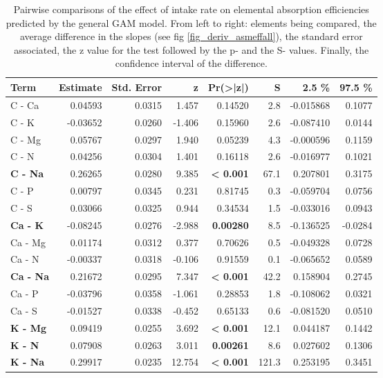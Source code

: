 \begin{table}[H]
\centering
\caption{\label{tab:table_pairs_d_ae}Pairwise comparisons of the effect of intake rate on elemental absorption efficiencies predicted by the general GAM model. From left to right: elements being compared, the average difference in the slopes (see fig \ref{fig_deriv_asmeffall}), the standard error associated, the z value for the test followed by the p- and the S- values. Finally, the confidence interval of the difference.}
\centering
\begin{tabular}[t]{>{}lrrr>{}rrrr}
\toprule
\textbf{Term} & \textbf{Estimate} & \textbf{Std. Error} & \textbf{z} & \textbf{Pr(>|z|)} & \textbf{S} & \textbf{2.5 \%} & \textbf{97.5 \%}\\
\midrule
C - Ca & 0.04593 & 0.0315 & 1.457 & 0.14520 & 2.8 & -0.015868 & 0.1077\\
C - K & -0.03652 & 0.0260 & -1.406 & 0.15960 & 2.6 & -0.087410 & 0.0144\\
C - Mg & 0.05767 & 0.0297 & 1.940 & 0.05239 & 4.3 & -0.000596 & 0.1159\\
C - N & 0.04256 & 0.0304 & 1.401 & 0.16118 & 2.6 & -0.016977 & 0.1021\\
\textbf{C - Na} & 0.26265 & 0.0280 & 9.385 & \textbf{< 0.001} & 67.1 & 0.207801 & 0.3175\\
C - P & 0.00797 & 0.0345 & 0.231 & 0.81745 & 0.3 & -0.059704 & 0.0756\\
C - S & 0.03066 & 0.0325 & 0.944 & 0.34534 & 1.5 & -0.033016 & 0.0943\\
\textbf{Ca - K} & -0.08245 & 0.0276 & -2.988 & \textbf{0.00280} & 8.5 & -0.136525 & -0.0284\\
Ca - Mg & 0.01174 & 0.0312 & 0.377 & 0.70626 & 0.5 & -0.049328 & 0.0728\\
Ca - N & -0.00337 & 0.0318 & -0.106 & 0.91559 & 0.1 & -0.065652 & 0.0589\\
\textbf{Ca - Na} & 0.21672 & 0.0295 & 7.347 & \textbf{< 0.001} & 42.2 & 0.158904 & 0.2745\\
Ca - P & -0.03796 & 0.0358 & -1.061 & 0.28853 & 1.8 & -0.108062 & 0.0321\\
Ca - S & -0.01527 & 0.0338 & -0.452 & 0.65133 & 0.6 & -0.081520 & 0.0510\\
\textbf{K - Mg} & 0.09419 & 0.0255 & 3.692 & \textbf{< 0.001} & 12.1 & 0.044187 & 0.1442\\
\textbf{K - N} & 0.07908 & 0.0263 & 3.011 & \textbf{0.00261} & 8.6 & 0.027602 & 0.1306\\
\textbf{K - Na} & 0.29917 & 0.0235 & 12.754 & \textbf{< 0.001} & 121.3 & 0.253195 & 0.3451\\

\end{tabular}
\end{table}
